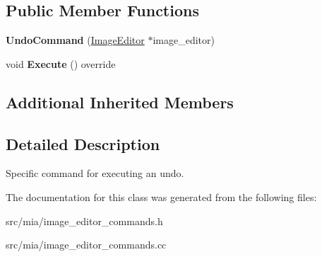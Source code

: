 \subsection*{Public Member Functions}
\begin{DoxyCompactItemize}
\item 
\mbox{\label{classimage__tools_1_1UndoCommand_a1b165c3d4f8203aae9bacd6977c01aa7}} 
{\bfseries Undo\+Command} (\hyperlink{classimage__tools_1_1ImageEditor}{Image\+Editor} $\ast$image\+\_\+editor)
\item 
\mbox{\label{classimage__tools_1_1UndoCommand_abef669f57d9cd1b66b3b613b3844ab20}} 
void {\bfseries Execute} () override
\end{DoxyCompactItemize}
\subsection*{Additional Inherited Members}


\subsection{Detailed Description}
Specific command for executing an undo. 

The documentation for this class was generated from the following files\+:\begin{DoxyCompactItemize}
\item 
src/mia/image\+\_\+editor\+\_\+commands.\+h\item 
src/mia/image\+\_\+editor\+\_\+commands.\+cc\end{DoxyCompactItemize}
